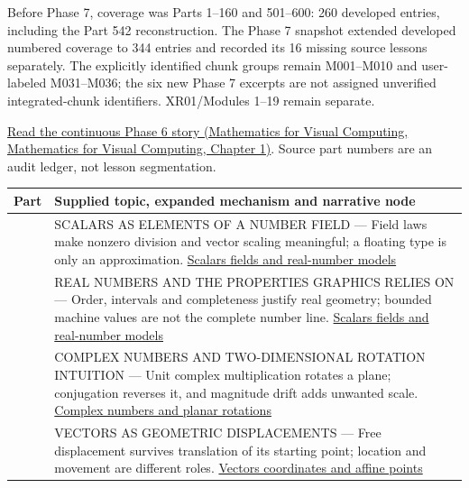 Before Phase 7, coverage was Parts 1--160 and 501--600: 260 developed entries, including the Part 542 reconstruction. The Phase 7 snapshot extended developed numbered coverage to 344 entries and recorded its 16 missing source lessons separately. The explicitly identified chunk groups remain M001--M010 and user-labeled M031--M036; the six new Phase 7 excerpts are not assigned unverified integrated-chunk identifiers. XR01/Modules 1--19 remain separate.

\href{../02-Mathematics-for-Visual-Computing/main.pdf\#nameddest=01-foundations-i-ch017-the-panel-gives-us-a-reason-to-learn}{Read the continuous Phase 6 story (Mathematics for Visual Computing, Mathematics for Visual Computing, Chapter 1)}. Source part numbers are an audit ledger, not lesson segmentation.

{\def\LTcaptype{none} %
\begin{longtable}[]{@{}
  >{\raggedright\arraybackslash}p{}
  >{\raggedright\arraybackslash}p{}@{}}
\toprule\noalign{}
\begin{minipage}[b]{\linewidth}\raggedright
Part
\end{minipage} & \begin{minipage}[b]{\linewidth}\raggedright
Supplied topic, expanded mechanism and narrative node
\end{minipage} \\
\midrule\noalign{}
\endhead
\bottomrule\noalign{}
\endlastfoot
501 & SCALARS AS ELEMENTS OF A NUMBER FIELD --- Field laws make nonzero division and vector scaling meaningful; a floating type is only an approximation. \hyperref[appendix-52051ad550fe]{Scalars fields and real-number models} \\
502 & REAL NUMBERS AND THE PROPERTIES GRAPHICS RELIES ON --- Order, intervals and completeness justify real geometry; bounded machine values are not the complete number line. \hyperref[appendix-52051ad550fe]{Scalars fields and real-number models} \\
503 & COMPLEX NUMBERS AND TWO-DIMENSIONAL ROTATION INTUITION --- Unit complex multiplication rotates a plane; conjugation reverses it, and magnitude drift adds unwanted scale. \hyperref[appendix-f77eadcc4a93]{Complex numbers and planar rotations} \\
504 & VECTORS AS GEOMETRIC DISPLACEMENTS --- Free displacement survives translation of its starting point; location and movement are different roles. \hyperref[appendix-0659864c0aa3]{Vectors coordinates and affine points} \\

\end{longtable}}
